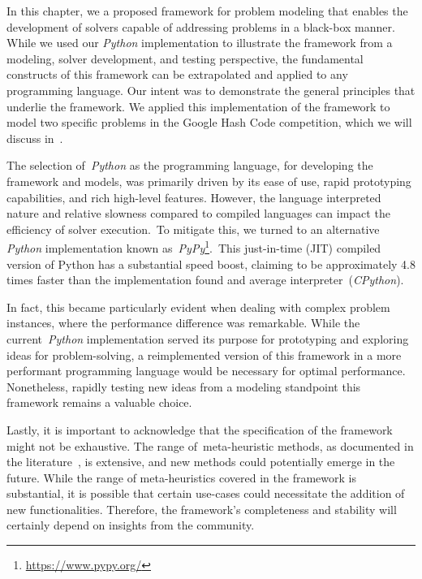 In this chapter, we a proposed framework for problem modeling that enables the
development of solvers capable of addressing problems in a black-box manner.
While we used our \emph{Python} implementation to illustrate the framework from
a modeling, solver development, and testing perspective, the fundamental
constructs of this framework can be extrapolated and applied to any programming
language. Our intent was to demonstrate the general principles that underlie the
framework. We applied this implementation of the framework to model two specific
problems in the Google Hash Code competition, which we will discuss
in~.

The selection of~\emph{Python} as the programming language, for developing the
framework and models, was primarily driven by its ease of use, rapid prototyping
capabilities, and rich high-level features. However, the language interpreted
nature and relative slowness compared to compiled languages can impact the
efficiency of solver execution.~To mitigate this, we turned to an alternative
\emph{Python} implementation known as~\emph{PyPy}\footnote{\url{https://www.pypy.org/}}.~This just-in-time (JIT) compiled
version of Python has a substantial speed boost, claiming to be approximately
4.8 times faster than the implementation found and average interpreter~(\emph{CPython}).

In fact, this became particularly evident when dealing with complex problem
instances, where the performance difference was remarkable. While the
current~\emph{Python} implementation served its purpose for prototyping and
exploring ideas for problem-solving, a reimplemented version of this framework
in a more performant programming language would be necessary for optimal
performance. Nonetheless, rapidly testing new ideas from a modeling standpoint
this framework remains a valuable choice.

Lastly, it is important to acknowledge that the specification of the framework
might not be exhaustive. The range of~\acrshort{meta-heuristic} methods, as
documented in the literature~\cite{osman1996metaheuristics}, is extensive, and
new methods could potentially emerge in the future. While the range of
meta-heuristics covered in the framework is substantial, it is possible that
certain use-cases could necessitate the addition of new functionalities.
Therefore, the framework's completeness and stability will certainly depend on
insights from the community.